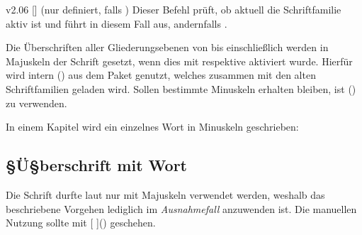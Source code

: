 \begin{Obsolete}{v2.06}{%
  []
}(nur definiert, falls )
\printdeclarationlist%
%
Dieser Befehl prüft, ob aktuell die Schriftfamilie \DIN aktiv ist und führt in 
diesem Fall  aus, andernfalls . 
\end{Obsolete}



%
Die Überschriften aller Gliederungsebenen von  bis einschließlich 
 werden in Majuskeln der Schrift \DIN gesetzt, wenn dies 
mit  respektive  aktiviert 
wurde. Hierfür wird intern () aus 
dem Paket  genutzt, welches zusammen mit den alten 
Schriftfamilien geladen wird. Sollen bestimmte Minuskeln erhalten bleiben, ist 
() zu verwenden.
%
\begin{Example}
In einem Kapitel wird ein einzelnes Wort in Minuskeln geschrieben:
\begin{Code}[escapechar=§]
\chapter{§Ü§berschrift mit  Wort}
\end{Code}
\end{Example}
%
Die Schrift \DIN durfte laut \CD nur mit Majuskeln verwendet werden, weshalb 
das beschriebene Vorgehen lediglich im \emph{Ausnahmefall} anzuwenden ist. 
Die manuellen Nutzung sollte mit 
[%
]() geschehen.


